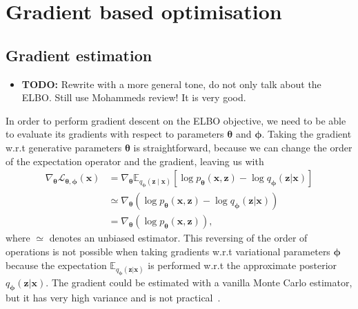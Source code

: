 \section{Gradient based optimisation}
\label{sec:gbopt}

\subsection{Gradient estimation}
\label{subsec:gbopt-gest}

\begin{itemize}
	\item \textbf{TODO:} Rewrite with a more general tone, do not only talk about the ELBO. Still use Mohammeds review! It is very good.
\end{itemize}

In order to perform gradient descent on the ELBO objective, we need to be able to evaluate its gradients with respect to parameters $\boldsymbol{\theta}$ and $\boldsymbol{\phi}$. Taking the gradient w.r.t generative parameters $\boldsymbol{\theta}$ is straightforward, because we can change the order of the expectation operator and the gradient, leaving us with
\begin{equation}
	\begin{aligned} 
		\nabla_{\boldsymbol{\theta}} \mathcal{L}_{\boldsymbol{\theta}, \boldsymbol{\phi}}(\mathbf{x}) &=\nabla_{\boldsymbol{\theta}} 	\mathbb{E}_{q_{\boldsymbol{\phi}}(\mathbf{z} \mid \mathbf{x})}\left[\log p_{\boldsymbol{\theta}}(\mathbf{x}, \mathbf{z})-\log q_{\boldsymbol{\phi}}(\mathbf{z} | \mathbf{x})\right] \\  & \simeq \nabla_{\boldsymbol{\theta}}\left(\log p_{\boldsymbol{\theta}}(\mathbf{x}, \mathbf{z})-\log q_{\boldsymbol{\phi}}(\mathbf{z} | \mathbf{x})\right) \\ &=\nabla_{\boldsymbol{\theta}}\left(\log p_{\boldsymbol{\theta}}(\mathbf{x}, \mathbf{z})\right) ,
	\end{aligned}
\end{equation}
where $\simeq$ denotes an unbiased estimator. This reversing of the order of operations is not possible when taking gradients w.r.t variational parameters $\boldsymbol{\phi}$ because the expectation $\mathbb{E}_{q_{\boldsymbol{\phi}}(\mathbf{z} | \mathbf{x})}$ is performed w.r.t the approximate posterior $q_{\boldsymbol{\phi}}(\mathbf{z} | \mathbf{x})$. The gradient could be estimated with a vanilla Monte Carlo estimator, but it has very high variance and is not practical~\cite{kingma2013auto}. 

